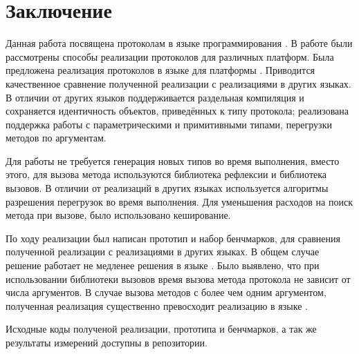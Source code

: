 \section*{Заключение}
Данная работа посвящена протоколам в языке программирования . В работе были рассмотрены способы реализации протоколов для различных платформ. Была предложена реализация протоколов в языке  для платформы . Приводится качественное сравнение полученной реализации с реализациями в других языках. В отличии от других языков поддерживается раздельная компиляция и сохраняется идентичность объектов, приведённых к типу протокола; реализована поддержка работы с параметрическими и примитивными типами, перегрузки методов по аргументам.

Для работы не требуется генерация новых типов во время выполнения, вместо этого, для вызова метода используются библиотека рефлексии и библиотека вызовов. В отличии от реализаций в других языках используется алгоритмы разрешения перегрузок во время выполнения. Для уменьшения расходов на поиск метода при вызове, было использовано кеширование.

По ходу реализации был написан прототип и набор бенчмарков, для сравнения полученной реализации с реализациями в других языках. В общем случае решение работает не медленее решения в языке . Было выявлено, что при использовании библиотеки вызовов время вызова метода протокола не зависит от числа аргументов. В случае вызова методов с более чем одним аргументом, полученная реализация существенно превосходит реализацию в языке .

Исходные коды полученой реализации, прототипа и бенчмарков, а так же результаты измерений доступны в репозитории\cite{repo}.
